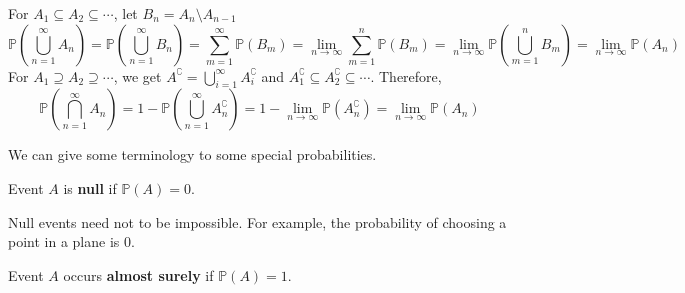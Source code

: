 \documentclass{huhtakm-template-book}
\newcommand{\prob}{\mathbb{P}}
\begin{document}
    \begin{proofing}
        For $A_{1}\subseteq A_{2}\subseteq\cdots$, let $B_{n}=A_{n}\setminus A_{n-1}$
        \begin{equation*}
		    \prob\left(\bigcup_{n=1}^{\infty}A_{n}\right)=\prob\left(\bigcup_{n=1}^{\infty}B_{n}\right)=\sum_{m=1}^{\infty}\prob(B_{m})=\lim_{n\to\infty}\sum_{m=1}^{n}\prob(B_{m})=\lim_{n\to\infty}\prob\left(\bigcup_{m=1}^{n}B_{m}\right)=\lim_{n\to\infty}\prob(A_{n})
        \end{equation*}
	    For $A_{1}\supseteq A_{2}\supseteq\cdots$, we get $A^{\complement}=\bigcup_{i=1}^{\infty}A_{i}^{\complement}$ and $A_{1}^{\complement}\subseteq A_{2}^{\complement}\subseteq\cdots$. Therefore,
        \begin{equation*}
            \prob\left(\bigcap_{n=1}^{\infty}A_{n}\right)=1-\prob\left(\bigcup_{n=1}^{\infty}A_{n}^{\complement}\right)=1-\lim_{n\to\infty}\prob(A_{n}^{\complement})=\lim_{n\to\infty}\prob(A_{n})
        \end{equation*}
    \end{proofing}
    We can give some terminology to some special probabilities.
    \begin{defn}
        Event $A$ is \textbf{null} if $\prob(A)=0$.
    \end{defn}
    \begin{rem}
        Null events need not to be impossible. For example, the probability of choosing a point in a plane is $0$.
    \end{rem}
    \begin{defn}
        Event $A$ occurs \textbf{almost surely} if $\prob(A)=1$.
    \end{defn}

\newpage
\end{document}
